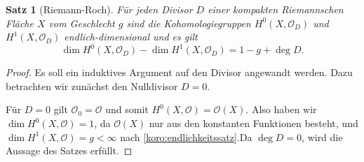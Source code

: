 \documentclass[11pt,a4paper,toc=bibliography]{scrartcl}
\theoremstyle{thm}
\newtheorem{satz}{Satz}[section]
\theoremstyle{def}
\theoremstyle{remark}
\begin{document}
\begin{satz}[Riemann-Roch]
Für jeden Divisor $D$ einer kompakten Riemannschen Fläche $X$ vom Geschlecht $g$ sind die Kohomologiegruppen $H^0(X,\mathcal{O}_D)$ und $H^1(X,\mathcal{O}_D)$ endlich-dimensional und es gilt
\[
\dim H^0(X,\mathcal{O}_D)-\dim H^1(X,\mathcal{O}_D)=1-g+\deg D.
\]
\end{satz}
\begin{proof}
	Es soll ein induktives Argument auf den Divisor angewandt werden. Dazu betrachten wir zunächst den Nulldivisor $D=0$.
	
	Für $D=0$ gilt $\mathcal{O}_0=\mathcal{O}$ und somit $H^0(X,\mathcal{O})=\mathcal{O}(X)$. Also haben wir $\dim H^0(X,\mathcal{O})=1$, da $\mathcal{O}(X)$ nur aus den konstanten Funktionen besteht\cite[S. 10]{forster}, und $\dim H^1(X,\mathcal{O})=g<\infty$ nach \ref{koro:endlichkeitssatz}.Da $\deg D=0$, wird die Aussage des Satzes erfüllt.
	

\end{proof}
\end{document}
